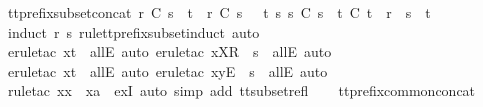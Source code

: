 \endisatagproof
{\isafoldproof}%
%
\isadelimproof
\isanewline
%
\endisadelimproof
\isanewline
{}\isamarkupfalse%
\ tt{\isacharunderscore}prefix{\isacharunderscore}subset{\isacharunderscore}concat{}{\isacharcolon}\ {\isachardoublequoteopen}r\ {\isasymlesssim}\isactrlsub C\ s\ {\isacharat}\ t\ {\isasymLongrightarrow}\ r\ {\isasymlesssim}\isactrlsub C\ s\ {\isasymor}\ {\isacharparenleft}{\isasymexists}\ t{\isacharprime}\ s{\isacharprime}{\isachardot}\ s{\isacharprime}\ {\isasymsubseteq}\isactrlsub C\ s\ {\isasymand}\ t{\isacharprime}\ {\isasymlesssim}\isactrlsub C\ t\ {\isasymand}\ r\ {\isacharequal}\ s{\isacharprime}\ {\isacharat}\ t{\isacharprime}{\isacharparenright}{\isachardoublequoteclose}\isanewline
%
\isadelimproof
\ \ %
\endisadelimproof
%
\isatagproof
{}\isamarkupfalse%
\ {\isacharparenleft}induct\ r\ s\ rule{\isacharcolon}tt{\isacharunderscore}prefix{\isacharunderscore}subset{\isachardot}induct{\isacharcomma}\ auto{\isacharparenright}\isanewline
\ \ \isamarkupfalse%
\ {\isacharparenleft}erule{\isacharunderscore}tac\ x{\isacharequal}{\isachardoublequoteopen}t{\isacharprime}{\isachardoublequoteclose}\ \ allE{\isacharcomma}\ auto{\isacharcomma}\ erule{\isacharunderscore}tac\ x{\isacharequal}{\isachardoublequoteopen}{\isacharbrackleft}X{\isacharbrackright}\isactrlsub R\ {\isacharhash}\ s{\isacharprime}{\isachardoublequoteclose}\ \ allE{\isacharcomma}\ auto{\isacharparenright}\isanewline
\ \ \isamarkupfalse%
\ {\isacharparenleft}erule{\isacharunderscore}tac\ x{\isacharequal}{\isachardoublequoteopen}t{\isacharprime}{\isachardoublequoteclose}\ \ allE{\isacharcomma}\ auto{\isacharcomma}\ erule{\isacharunderscore}tac\ x{\isacharequal}{\isachardoublequoteopen}{\isacharbrackleft}y{\isacharbrackright}\isactrlsub E\ {\isacharhash}\ s{\isacharprime}{\isachardoublequoteclose}\ \ allE{\isacharcomma}\ auto{\isacharparenright}\isanewline
\ \ \isamarkupfalse%
\ {\isacharparenleft}rule{\isacharunderscore}tac\ x{\isacharequal}{\isachardoublequoteopen}x\ {\isacharhash}\ xa{\isachardoublequoteclose}\ \ exI{\isacharcomma}\ auto\ simp\ add{\isacharcolon}\ tt{\isacharunderscore}subset{\isacharunderscore}refl{\isacharparenright}\isanewline
\ \ \isamarkupfalse%
%
\endisatagproof
{\isafoldproof}%
%
\isadelimproof
\isanewline
%
\endisadelimproof
\isanewline
{}\isamarkupfalse%
\ tt{\isacharunderscore}prefix{\isacharunderscore}common{\isacharunderscore}concat{\isacharcolon}\isanewline
